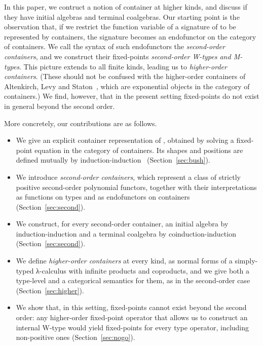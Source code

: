 In this paper, we contruct a notion of container at higher kinds, and discuss if they have initial algebras and terminal coalgebras. Our starting point is the observation that, if we restrict the function variable of a signature of  to be represented by containers, the signature becomes an endofunctor on the category of containers. We call the syntax of such endofunctors the \emph{second-order containers}, and we construct their fixed-points \emph{second-order W-types and M-types}. This picture extends to all finite kinds, leading us to \emph{higher-order containers}. (These should not be confused with the higher-order containers of Altenkirch, Levy and Staton~\cite{AltenkirchLS10}, which are exponential objects in the category of containers.) We find, however, that in the present setting fixed-points do not exist in general beyond the second order.

More concretely, our contributions are as follows.
\begin{itemize}
\item We give an explicit container representation of , obtained by solving a fixed-point equation in the category of containers. Its shapes and positions are defined mutually by induction-induction~\cite{NordvallForsbergS10} (Section~\ref{sec:bush}).

\item We introduce \emph{second-order containers}, which represent a class of strictly positive second-order polynomial functors, together with their    interpretations as functions on types and as endofunctors on containers (Section~\ref{sec:second}).

\item We construct, for every second-order container, an initial algebra  by induction-induction and a terminal coalgebra  by coinduction-induction (Section~\ref{sec:second}). \item We define \emph{higher-order containers} at every kind, as normal forms of a simply-typed λ-calculus with infinite products and coproducts, and we give both a type-level and a categorical semantics for them, as in the second-order case (Section~\ref{sec:higher}).

\item We show that, in this setting, fixed-points cannot exist beyond the second order: any higher-order fixed-point operator that allows us to construct an internal W-type would yield fixed-points for every type operator, including non-positive ones (Section~\ref{sec:nogo}).
  
\end{itemize}

